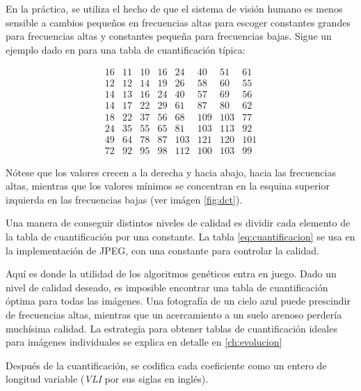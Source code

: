En la práctica, se utiliza el hecho de que el sistema de visión humano es menos
sensible a cambios pequeños en frecuencias altas para escoger constantes
grandes para frecuencias altas y constantes pequeña para frecuencias bajas.
Sigue un ejemplo dado en \cite{jpeg-paper} para una tabla de cuantificación
típica:

\begin{equation}
    \begin{matrix}
        16 & 11 & 10 & 16 & 24  & 40  & 51  & 61 \\
        12 & 12 & 14 & 19 & 26  & 58  & 60  & 55 \\
        14 & 13 & 16 & 24 & 40  & 57  & 69  & 56 \\
        14 & 17 & 22 & 29 & 61  & 87  & 80  & 62 \\
        18 & 22 & 37 & 56 & 68  & 109 & 103 & 77 \\
        24 & 35 & 55 & 65 & 81  & 103 & 113 & 92 \\
        49 & 64 & 78 & 87 & 103 & 121 & 120 & 101 \\
        72 & 92 & 95 & 98 & 112 & 100 & 103 & 99
    \end{matrix}
    \label{fig:reference-table}
\end{equation}
\label{eq:cuantificacion}

Nótese que los valores crecen a la derecha y hacia abajo, hacia las frecuencias
altas, mientras que los valores mínimos se concentran en la esquina superior
izquierda en las frecuencias bajas (ver imágen \ref{fig:dct}).

Una manera de conseguir distintos niveles de calidad es dividir cada elemento
de la tabla de cuantificación por una constante. La tabla
\ref{eq:cuantificacion} se usa en la implementación de JPEG, con una constante
para controlar la calidad.

Aquí es donde la utilidad de los algoritmos genéticos entra en juego. Dado un
nivel de calidad deseado, es imposible encontrar una tabla de cuantificación
óptima para todas las imágenes. Una fotografía de un cielo azul puede
prescindir de frecuencias altas, mientras que un acercamiento a un suelo
arenoso perdería muchísima calidad. La estrategia para obtener tablas de
cuantificación ideales para imágenes individuales se explica en detalle en
\ref{ch:evolucion}


Después de la cuantificación, se codifica cada coeficiente como un entero de
longitud variable (\emph{VLI} por sus siglas en inglés).

